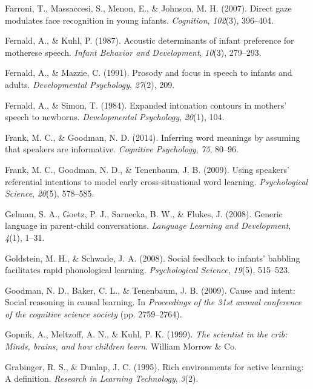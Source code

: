 \documentclass[a4paper,man,apacite,floatsintext]{apa6}
\begin{document}
\hypertarget{ref-farroni2007direct}{}
Farroni, T., Massaccesi, S., Menon, E., \& Johnson, M. H. (2007). Direct
gaze modulates face recognition in young infants. \emph{Cognition},
\emph{102}(3), 396--404.

\hypertarget{ref-fernald1987acoustic}{}
Fernald, A., \& Kuhl, P. (1987). Acoustic determinants of infant
preference for motherese speech. \emph{Infant Behavior and Development},
\emph{10}(3), 279--293.

\hypertarget{ref-fernald1991prosody}{}
Fernald, A., \& Mazzie, C. (1991). Prosody and focus in speech to
infants and adults. \emph{Developmental Psychology}, \emph{27}(2), 209.

\hypertarget{ref-fernald1984expanded}{}
Fernald, A., \& Simon, T. (1984). Expanded intonation contours in
mothers' speech to newborns. \emph{Developmental Psychology},
\emph{20}(1), 104.

\hypertarget{ref-frank2014inferring}{}
Frank, M. C., \& Goodman, N. D. (2014). Inferring word meanings by
assuming that speakers are informative. \emph{Cognitive Psychology},
\emph{75}, 80--96.

\hypertarget{ref-frank2009using}{}
Frank, M. C., Goodman, N. D., \& Tenenbaum, J. B. (2009). Using
speakers' referential intentions to model early cross-situational word
learning. \emph{Psychological Science}, \emph{20}(5), 578--585.

\hypertarget{ref-gelman2008generic}{}
Gelman, S. A., Goetz, P. J., Sarnecka, B. W., \& Flukes, J. (2008).
Generic language in parent-child conversations. \emph{Language Learning
and Development}, \emph{4}(1), 1--31.

\hypertarget{ref-goldstein2008social}{}
Goldstein, M. H., \& Schwade, J. A. (2008). Social feedback to infants'
babbling facilitates rapid phonological learning. \emph{Psychological
Science}, \emph{19}(5), 515--523.

\hypertarget{ref-goodman2009cause}{}
Goodman, N. D., Baker, C. L., \& Tenenbaum, J. B. (2009). Cause and
intent: Social reasoning in causal learning. In \emph{Proceedings of the
31st annual conference of the cognitive science society} (pp.
2759--2764).

\hypertarget{ref-gopnik1999scientist}{}
Gopnik, A., Meltzoff, A. N., \& Kuhl, P. K. (1999). \emph{The scientist
in the crib: Minds, brains, and how children learn.} William Morrow \&
Co.

\hypertarget{ref-grabinger1995rich}{}
Grabinger, R. S., \& Dunlap, J. C. (1995). Rich environments for active
learning: A definition. \emph{Research in Learning Technology},
\emph{3}(2).
\end{document}
